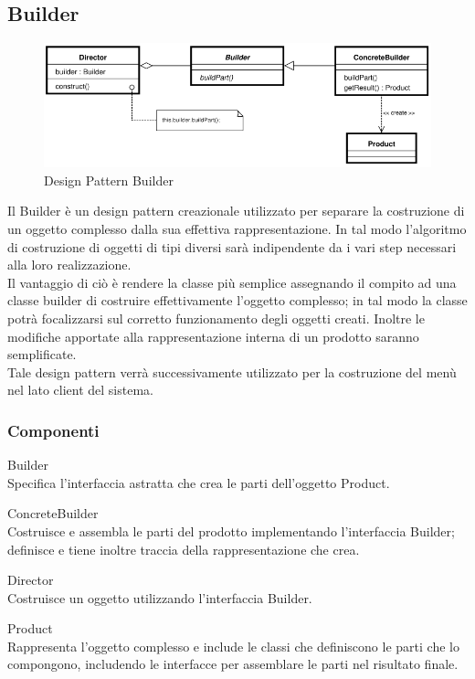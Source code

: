 \documentclass[a4paper, titlepage]{article}
\begin{document}
\subsection{Builder}
\begin{figure}[htp]
\centering
\includegraphics[scale=0.60]{Img/builder.png}
\caption{Design Pattern Builder}
\label{}
\end{figure}
Il Builder è un design pattern creazionale utilizzato per separare la costruzione di un oggetto complesso dalla sua effettiva rappresentazione. In tal modo l'algoritmo di costruzione di oggetti di tipi diversi sarà indipendente da i vari step necessari alla loro realizzazione.
\\ Il vantaggio di ciò è rendere la classe più semplice assegnando il compito ad una classe builder di costruire effettivamente l'oggetto complesso; in tal modo la classe potrà focalizzarsi sul corretto funzionamento degli oggetti creati.
Inoltre le modifiche apportate alla rappresentazione interna di un prodotto saranno semplificate.
\\ Tale design pattern verrà successivamente utilizzato per la costruzione del menù nel lato client del sistema.

\subsubsection{Componenti}
\begin{description}\item{Builder}
\\ Specifica l'interfaccia astratta che crea le parti dell'oggetto Product.
\item {ConcreteBuilder} 
\\Costruisce e assembla le parti del prodotto implementando l'interfaccia Builder; definisce e tiene inoltre traccia della rappresentazione che crea.
\item{Director} 
\\Costruisce un oggetto utilizzando l'interfaccia Builder.
\item{Product} 
\\Rappresenta l'oggetto complesso e include le classi che definiscono le parti che lo compongono, includendo le interfacce per assemblare le parti nel risultato finale.
\end{description}
\end{document}
